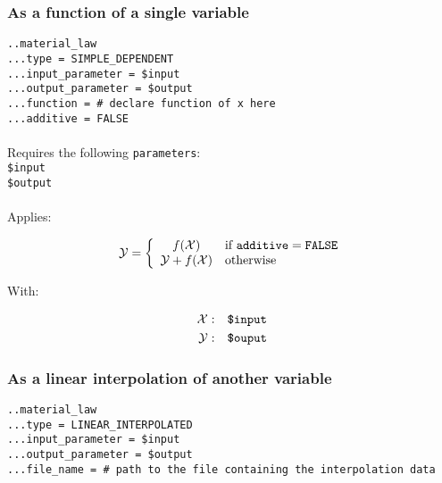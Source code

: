 \documentclass[10pt]{article}
\begin{document}
\subsubsection{As a function of a single variable}

\noindent \verb+..material_law+\\
\verb+...type = SIMPLE_DEPENDENT+\\
\verb+...input_parameter = $input+\\
\verb+...output_parameter = $output+\\
\verb+...function = # declare function of x here+\\
\verb+...additive = FALSE+

\paragraph{}Requires the following \verb+parameters+:\\

\noindent \verb+$input+\\
\verb+$output+

\paragraph{}Applies:

\begin{equation}
	\mathcal{Y} = \left\{ \begin{array}{cl} f(\mathcal{X}) & \text{if }\verb+additive+ = \verb+FALSE+  \\ \mathcal{Y}+f(\mathcal{X}) & \text{otherwise} \end{array} \right.
\end{equation}

With:

\begin{eqnarray}
	\mathcal{X} & : & \verb+$input+ \notag \\
	\mathcal{Y} & : & \verb+$ouput+\notag  
\end{eqnarray}

\subsubsection{As a linear interpolation of another variable}

\noindent \verb+..material_law+\\
\verb+...type = LINEAR_INTERPOLATED+\\
\verb+...input_parameter = $input+\\
\verb+...output_parameter = $output+\\
\verb+...file_name = # path to the file containing the interpolation data+
\end{document}
